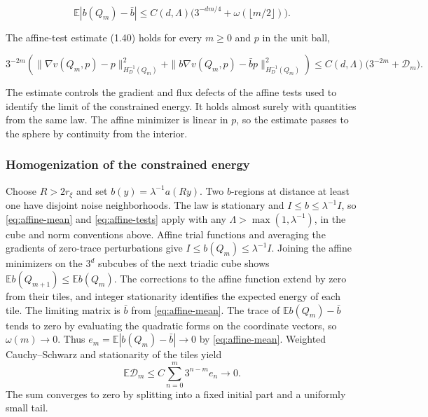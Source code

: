 \documentclass[11pt]{article}
\begin{document}
\begin{equation}\label{eq:affine-mean}
\mathbb E|b(Q_m)-\bar b|\le C(d,\Lambda)\big(3^{-dm/4}+\omega(\lfloor m/2\rfloor)\big).
\end{equation}

The affine-test estimate (1.40) holds for every \(m\ge0\) and \(p\) in the unit ball,

\begin{equation}\label{eq:affine-tests}
3^{-2m}\left(\|\nabla v(Q_m,p)-p\|_{H_D^{-1}(Q_m)}^2+
    \|b\nabla v(Q_m,p)-\bar b p\|_{H_D^{-1}(Q_m)}^2\right)
    \le C(d,\Lambda)\big(3^{-2m}+\mathcal D_m\big).
\end{equation}

The estimate controls the gradient and flux defects of the affine tests used to identify the limit of the constrained energy. It holds almost surely with quantities from the same law. The affine minimizer is linear in \(p\), so the estimate passes to the sphere by continuity from the interior.

\subsubsection{Homogenization of the constrained energy}\label{homogenization-of-the-constrained-energy}

Choose \(R>2r_\xi\) and set \(b(y)=\lambda^{-1}a(Ry)\). Two \(b\)-regions at distance at least one have disjoint noise neighborhoods. The law is stationary and \(I\le b\le \lambda^{-1}I\), so \eqref{eq:affine-mean} and \eqref{eq:affine-tests} apply with any \(\Lambda>\max(1,\lambda^{-1})\), in the cube and norm conventions above. Affine trial functions and averaging the gradients of zero-trace perturbations give \(I\le b(Q_m)\le\lambda^{-1}I\). Joining the affine minimizers on the \(3^d\) subcubes of the next triadic cube shows \(\mathbb E b(Q_{m+1})\le\mathbb E b(Q_m)\). The corrections to the affine function extend by zero from their tiles, and integer stationarity identifies the expected energy of each tile. The limiting matrix is \(\bar b\) from \eqref{eq:affine-mean}. The trace of \(\mathbb E b(Q_m)-\bar b\) tends to zero by evaluating the quadratic forms on the coordinate vectors, so \(\omega(m)\to0\). Thus \(e_m=\mathbb E|b(Q_m)-\bar b|\to0\) by \eqref{eq:affine-mean}. Weighted Cauchy--Schwarz and stationarity of the tiles yield \[
 \mathbb E\mathcal D_m\le C\sum_{n=0}^m3^{n-m}e_n\longrightarrow0.
\] The sum converges to zero by splitting into a fixed initial part and a uniformly small tail.
\end{document}
